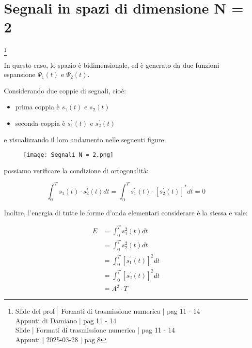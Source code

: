 \newpage 

\section{Segnali in spazi di dimensione N = 2}
\footnote{Slide del prof | Formati di trasmissione numerica | pag 11 - 14\\  
Appunti di Damiano | pag 11 - 14\\
Slide | Formati di trasmissione numerica | pag  11 - 14\\
Appunti | 2025-03-28 | pag 8 
}

In questo caso, lo spazio è bidimensionale, ed è generato da due funzioni espansione $\Psi_1 (t)$ e $\Psi_2 (t)$. \newline 

Considerando due coppie di segnali, cioè: 

\begin{itemize}
    \item prima coppia è $s_1 (t)$ e $s_2 (t)$
    \item seconda coppia è $s_1^{'} (t)$ e $s_2^{'} (t)$
\end{itemize} 

e visualizzando il loro andamento nelle seguenti figure: 

\begin{figure}[h]
    \centering
    \texttt{[image: Segnali N = 2.png]}
\end{figure}

possiamo verificare la condizione di ortogonalità: 

{
    \Large 
    \begin{equation}
        \int_{0}^{T}
        s_1 (t) \cdot s_2^{*} (t) 
        dt 
        =
        \int_{0}^{T}
        s_1^{'} (t) \cdot \left[s_2^{'} (t) \right]^{*}  
        dt 
        = 
        0
    \end{equation}
}

Inoltre, l'energia di tutte le forme d'onda elementari considerare è la stessa e vale: 

{
    \Large 
    \begin{equation}
        \begin{split}
            E 
            &= 
            \int_{0}^{T}
            s_1^{2} (t)
            dt
            \\
            &= 
            \int_{0}^{T}
            s_2^{2} (t)
            dt
            \\
            &= 
            \int_{0}^{T}
            \left[ s_1^{'} (t) \right]^{2} 
            dt
            \\
            &= 
            \int_{0}^{T}
            \left[ s_2^{'} (t) \right]^{2}
            dt
            \\
            &=
            A^{2} \cdot T
        \end{split}
    \end{equation}
}

